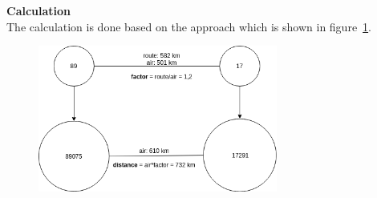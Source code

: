 \noindent\textbf{Calculation}\\
The calculation is done based on the approach which is shown in figure~\ref{fig:calc}.
\begin{figure}[H]
\centering
\includegraphics[width=0.7\textwidth]{img/calc}
\label{fig:calc}
\end{figure}
